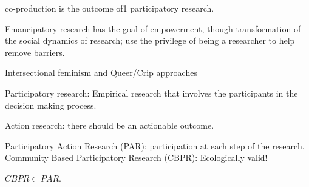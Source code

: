 \documentclass{TC}
\begin{document}
co-production is the outcome of1 participatory research.

Emancipatory research has the goal of empowerment, though transformation of the social dynamics of research; use the privilege of being a researcher to help remove barriers. 

Intersectional feminism and Queer/Crip approaches 

Participatory research: Empirical research that involves the participants in the decision making process. 

Action research: there should be an actionable outcome. 

Participatory Action Research (PAR): participation at each step of the research. 
Community Based Participatory Research (CBPR): Ecologically valid!

$CBPR \subset PAR$.
\end{document}
